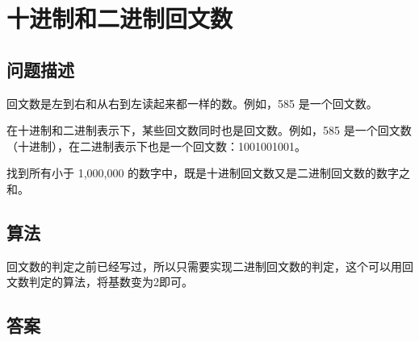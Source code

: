 \section{十进制和二进制回文数}
\subsection{问题描述}
\begin{tcolorbox}

回文数是左到右和从右到左读起来都一样的数。例如，585 是一个回文数。

在十进制和二进制表示下，某些回文数同时也是回文数。例如，585 是一个回文数（十进制），在二进制表示下也是一个回文数：1001001001。

找到所有小于 1,000,000 的数字中，既是十进制回文数又是二进制回文数的数字之和。
\end{tcolorbox}

\subsection{算法}
回文数的判定之前已经写过，所以只需要实现二进制回文数的判定，这个可以用回文数判定的算法，将基数变为2即可。


\subsection{答案}
